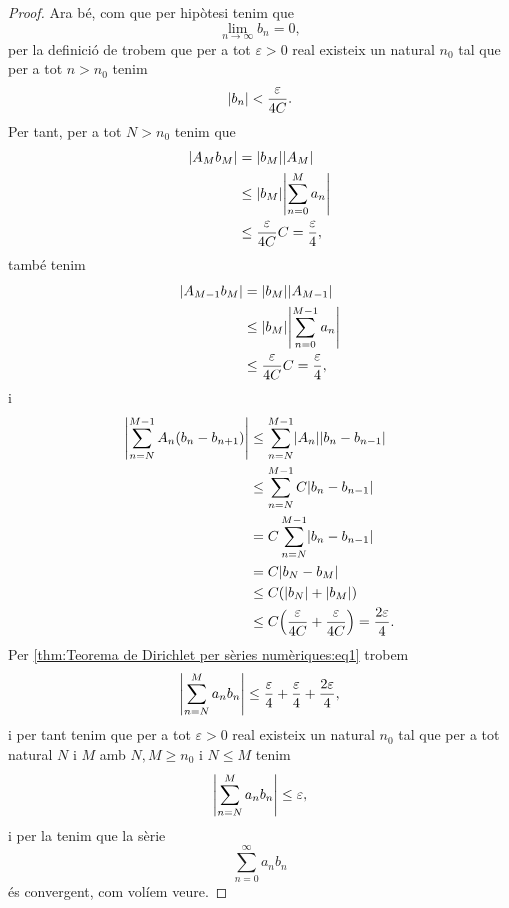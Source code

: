 \documentclass[../../Main.tex]{subfiles}
\begin{document}
\begin{theorem}
\begin{proof}
			Ara bé, com que per hipòtesi tenim que
			\[\lim_{n\to\infty}b_{n}=0,\]
			per la definició de  trobem que per a tot \(\varepsilon>0\) real existeix un natural \(n_{0}\) tal que per a tot \(n>n_{0}\) tenim
			\[\abs{b_{n}}<\frac{\varepsilon}{4C}.\]
			Per tant, per a tot \(N>n_{0}\) tenim que
			\begin{align*}
				\abs{A_{M}b_{M}}&=\abs{b_{M}}\abs{A_{M}} \\
				&\leq\abs{b_{M}}\abs{\sum_{n=0}^{M}a_{n}} \\ %
				&\leq\frac{\varepsilon}{4C}C=\frac{\varepsilon}{4},
			\end{align*}
			també tenim
			\begin{align*}
				\abs{A_{M-1}b_{M}}&=\abs{b_{M}}\abs{A_{M-1}} \\
				&\leq\abs{b_{M}}\abs{\sum_{n=0}^{M-1}a_{n}} \\ %
				&\leq\frac{\varepsilon}{4C}C=\frac{\varepsilon}{4},
			\end{align*}
			i
			\begin{align*}
				\abs{\sum_{n=N}^{M-1}A_{n}(b_{n}-b_{n+1})}&\leq\sum_{n=N}^{M-1}\abs{A_{n}}\abs{b_{n}-b_{n-1}} \\
				&\leq\sum_{n=N}^{M-1}C\abs{b_{n}-b_{n-1}} \\
				&=C\sum_{n=N}^{M-1}\abs{b_{n}-b_{n-1}} \\
				&=C\abs{b_{N}-b_{M}} \\
				&\leq C(\abs{b_{N}}+\abs{b_{M}}) \\
				&\leq C\left(\frac{\varepsilon}{4C}+\frac{\varepsilon}{4C}\right)=\frac{2\varepsilon}{4}.
			\end{align*}
			Per \eqref{thm:Teorema de Dirichlet per sèries numèriques:eq1} trobem
			\[\abs{\sum_{n=N}^{M}a_{n}b_{n}}\leq\frac{\varepsilon}{4}+\frac{\varepsilon}{4}+\frac{2\varepsilon}{4},\]
			i per tant tenim que per a tot \(\varepsilon>0\) real existeix un natural \(n_{0}\) tal que per a tot natural \(N\) i \(M\) amb \(N,M\geq n_{0}\) i \(N\leq M\) tenim
			\[\abs{\sum_{n=N}^{M}a_{n}b_{n}}\leq\varepsilon,\]
			i per la  tenim que la sèrie
			\[\sum_{n=0}^{\infty}a_{n}b_{n}\]
			és convergent, com volíem veure.
		\end{proof}
	\end{theorem}
\end{document}
